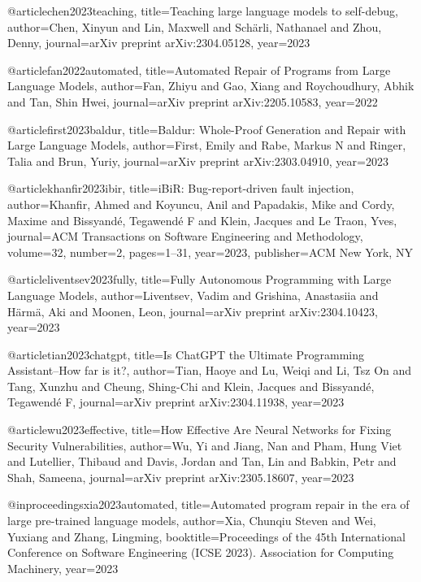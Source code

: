 @article{chen2023teaching,
  title={Teaching large language models to self-debug},
  author={Chen, Xinyun and Lin, Maxwell and Sch{\"a}rli, Nathanael and Zhou, Denny},
  journal={arXiv preprint arXiv:2304.05128},
  year={2023}
}

@article{fan2022automated,
  title={Automated Repair of Programs from Large Language Models},
  author={Fan, Zhiyu and Gao, Xiang and Roychoudhury, Abhik and Tan, Shin Hwei},
  journal={arXiv preprint arXiv:2205.10583},
  year={2022}
}

@article{first2023baldur,
  title={Baldur: Whole-Proof Generation and Repair with Large Language Models},
  author={First, Emily and Rabe, Markus N and Ringer, Talia and Brun, Yuriy},
  journal={arXiv preprint arXiv:2303.04910},
  year={2023}
}

@article{khanfir2023ibir,
  title={iBiR: Bug-report-driven fault injection},
  author={Khanfir, Ahmed and Koyuncu, Anil and Papadakis, Mike and Cordy, Maxime and Bissyand{\'e}, Tegawend{\'e} F and Klein, Jacques and Le Traon, Yves},
  journal={ACM Transactions on Software Engineering and Methodology},
  volume={32},
  number={2},
  pages={1--31},
  year={2023},
  publisher={ACM New York, NY}
}

@article{liventsev2023fully,
  title={Fully Autonomous Programming with Large Language Models},
  author={Liventsev, Vadim and Grishina, Anastasiia and H{\"a}rm{\"a}, Aki and Moonen, Leon},
  journal={arXiv preprint arXiv:2304.10423},
  year={2023}
}

@article{tian2023chatgpt,
  title={Is ChatGPT the Ultimate Programming Assistant--How far is it?},
  author={Tian, Haoye and Lu, Weiqi and Li, Tsz On and Tang, Xunzhu and Cheung, Shing-Chi and Klein, Jacques and Bissyand{\'e}, Tegawend{\'e} F},
  journal={arXiv preprint arXiv:2304.11938},
  year={2023}
}

@article{wu2023effective,
  title={How Effective Are Neural Networks for Fixing Security Vulnerabilities},
  author={Wu, Yi and Jiang, Nan and Pham, Hung Viet and Lutellier, Thibaud and Davis, Jordan and Tan, Lin and Babkin, Petr and Shah, Sameena},
  journal={arXiv preprint arXiv:2305.18607},
  year={2023}
}

@inproceedings{xia2023automated,
  title={Automated program repair in the era of large pre-trained language models},
  author={Xia, Chunqiu Steven and Wei, Yuxiang and Zhang, Lingming},
  booktitle={Proceedings of the 45th International Conference on Software Engineering (ICSE 2023). Association for Computing Machinery},
  year={2023}
}




